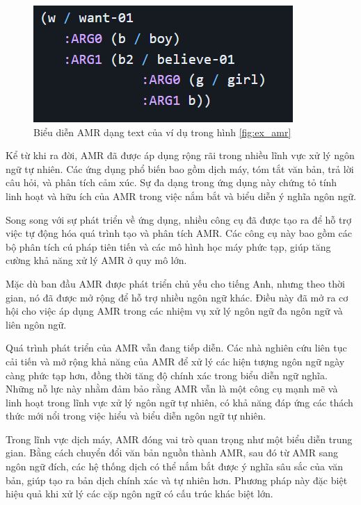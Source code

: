 \begin{figure}[H]
    \centering
    \includegraphics[width=1\linewidth]{Images/GDL/amr_ex_text.png}
    \caption{Biểu diễn AMR dạng text của ví dụ trong hình \ref{fig:ex_amr}}
\end{figure}

Kể từ khi ra đời, AMR đã được áp dụng rộng rãi trong nhiều lĩnh vực xử lý ngôn ngữ tự nhiên. Các ứng dụng phổ biến bao gồm dịch máy, tóm tắt văn bản, trả lời câu hỏi, và phân tích cảm xúc. Sự đa dạng trong ứng dụng này chứng tỏ tính linh hoạt và hữu ích của AMR trong việc nắm bắt và biểu diễn ý nghĩa ngôn ngữ.

Song song với sự phát triển về ứng dụng, nhiều công cụ đã được tạo ra để hỗ trợ việc tự động hóa quá trình tạo và phân tích AMR. Các công cụ này bao gồm các bộ phân tích cú pháp tiên tiến và các mô hình học máy phức tạp, giúp tăng cường khả năng xử lý AMR ở quy mô lớn.

Mặc dù ban đầu AMR được phát triển chủ yếu cho tiếng Anh, nhưng theo thời gian, nó đã được mở rộng để hỗ trợ nhiều ngôn ngữ khác. Điều này đã mở ra cơ hội cho việc áp dụng AMR trong các nhiệm vụ xử lý ngôn ngữ đa ngôn ngữ và liên ngôn ngữ.

Quá trình phát triển của AMR vẫn đang tiếp diễn. Các nhà nghiên cứu liên tục cải tiến và mở rộng khả năng của AMR để xử lý các hiện tượng ngôn ngữ ngày càng phức tạp hơn, đồng thời tăng độ chính xác trong biểu diễn ngữ nghĩa. Những nỗ lực này nhằm đảm bảo rằng AMR vẫn là một công cụ mạnh mẽ và linh hoạt trong lĩnh vực xử lý ngôn ngữ tự nhiên, có khả năng đáp ứng các thách thức mới nổi trong việc hiểu và biểu diễn ngôn ngữ tự nhiên.

Trong lĩnh vực dịch máy, AMR đóng vai trò quan trọng như một biểu diễn trung gian. Bằng cách chuyển đổi văn bản nguồn thành AMR, sau đó từ AMR sang ngôn ngữ đích, các hệ thống dịch có thể nắm bắt được ý nghĩa sâu sắc của văn bản, giúp tạo ra bản dịch chính xác và tự nhiên hơn. Phương pháp này đặc biệt hiệu quả khi xử lý các cặp ngôn ngữ có cấu trúc khác biệt lớn.

